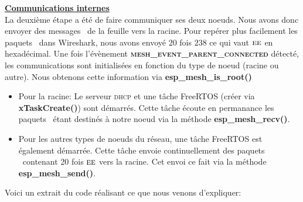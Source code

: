         \vspace{0.5cm}
        \textbf{\underline{Communications internes}}\\
            La deuxième étape a été de faire communiquer ses deux noeuds. Nous avons donc envoyer des
            messages \espmesh\ de la feuille vers la racine.
            Pour repérer plus facilement les paquets \espmesh\ dans Wireshark, nous avons envoyé
            20 fois $238$ ce qui vaut $\textsc{ee}$ en hexadécimal.
            Une fois l'évènement \textbf{\textsc{mesh\_event\_parent\_connected}} détecté, les communications sont initialisées
            en fonction du type de noeud (racine ou autre). Nous obtenons cette information via \textbf{{esp\_mesh\_is\_root()}}
            \begin{itemize}
                \item Pour la racine: Le serveur \textsc{dhcp} et une tâche FreeRTOS (créer via \textbf{{xTaskCreate()}})
                sont démarrés. Cette tâche écoute en permanance les paquets \espmesh\ étant destinés à notre noeud via la méthode
                \textbf{{esp\_mesh\_recv()}}.
                \item Pour les autres types de noeuds du réseau, une tâche FreeRTOS est également démarrée. Cette tâche envoie continuellement
                des paquets \espmesh\ contenant 20 fois $\textsc{ee}$ vers la racine. Cet envoi ce fait via la méthode
                \textbf{{esp\_mesh\_send()}}.
            \end{itemize}
            Voici un extrait du code réalisant ce que nous venons d'expliquer:
